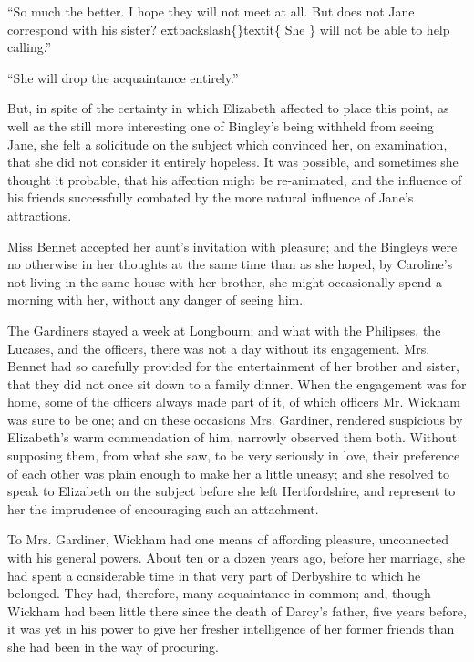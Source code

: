 \documentclass[10pt]{book}
\begin{document}
   “So much the better. I hope they will not meet at all. But does not Jane
correspond with his sister?
   	extbackslash\{\}textit\{
    She
   \}
   will not be able to help calling.”
  

   “She will drop the acquaintance entirely.”
  

   But, in spite of the certainty in which Elizabeth affected to place this
point, as well as the still more interesting one of Bingley’s being
withheld from seeing Jane, she felt a solicitude on the subject which
convinced her, on examination, that she did not consider it entirely
hopeless. It was possible, and sometimes she thought it probable, that
his affection might be re-animated, and the influence of his friends
successfully combated by the more natural influence of Jane’s
attractions.
  

   Miss Bennet accepted her aunt’s invitation with pleasure; and the
Bingleys were no otherwise in her thoughts at the same time than as she
hoped, by Caroline’s not living in the same house with her brother, she
might occasionally spend a morning with her, without any danger of
seeing him.
  

   The Gardiners stayed a week at Longbourn; and what with the Philipses,
the Lucases, and the officers, there was not a day without its
engagement. Mrs. Bennet had so carefully provided for the entertainment
of her brother and sister, that they did not once sit down to a family
dinner. When the engagement was for home,
   some of the officers always
made part of it, of which officers Mr. Wickham was sure to be one; and
on these occasions Mrs. Gardiner, rendered suspicious by Elizabeth’s
warm commendation of him, narrowly observed them both. Without supposing
them, from what she saw, to be very seriously in love, their preference
of each other was plain enough to make her a little uneasy; and she
resolved to speak to Elizabeth on the subject before she left
Hertfordshire, and represent to her the imprudence of encouraging such
an attachment.
  

   To Mrs. Gardiner, Wickham had one means of affording pleasure,
unconnected with his general powers. About ten or a dozen years ago,
before her marriage, she had spent a considerable time in that very part
of Derbyshire to which he belonged. They had, therefore, many
acquaintance in common; and, though Wickham had been little there since
the death of Darcy’s father, five years before, it was yet in his power
to give her fresher intelligence of her former friends than she had been
in the way of procuring.
  
\end{document}
